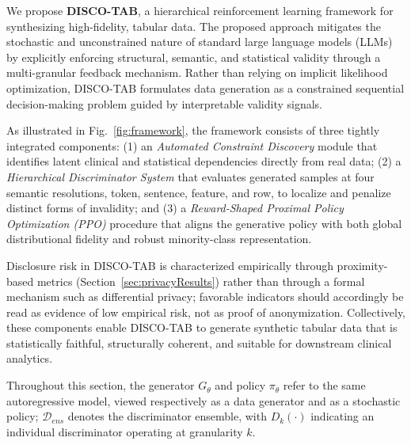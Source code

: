 We propose \textbf{DISCO-TAB}, a hierarchical reinforcement learning framework for synthesizing high-fidelity,  tabular data. The proposed approach mitigates the stochastic and unconstrained nature of standard large language models (LLMs) by explicitly enforcing structural, semantic, and statistical validity through a multi-granular feedback mechanism. Rather than relying on implicit likelihood optimization, DISCO-TAB formulates data generation as a constrained sequential decision-making problem guided by interpretable validity signals.

As illustrated in Fig.~\ref{fig:framework}, the framework consists of three tightly integrated components: (1) an \emph{Automated Constraint Discovery} module that identifies latent clinical and statistical dependencies directly from real data; (2) a \emph{Hierarchical Discriminator System} that evaluates generated samples at four semantic resolutions, token, sentence, feature, and row, to localize and penalize distinct forms of invalidity; and (3) a \emph{Reward-Shaped Proximal Policy Optimization (PPO)} procedure that aligns the generative policy with both global distributional fidelity and robust minority-class representation.

Disclosure risk in DISCO-TAB is characterized empirically through proximity-based metrics (Section~\ref{sec:privacyResults}) rather than through a formal mechanism such as differential privacy; favorable indicators should accordingly be read as evidence of low empirical risk, not as proof of anonymization.
Collectively, these components enable DISCO-TAB to generate synthetic tabular data that is statistically faithful, structurally coherent, and suitable for downstream clinical analytics.

Throughout this section, the generator $G_\theta$ and policy $\pi_\theta$ refer to the same autoregressive model, viewed respectively as a data generator and as a stochastic policy; $\mathcal{D}_{ens}$ denotes the discriminator ensemble, with $D_k(\cdot)$ indicating an individual discriminator operating at granularity $k$.



